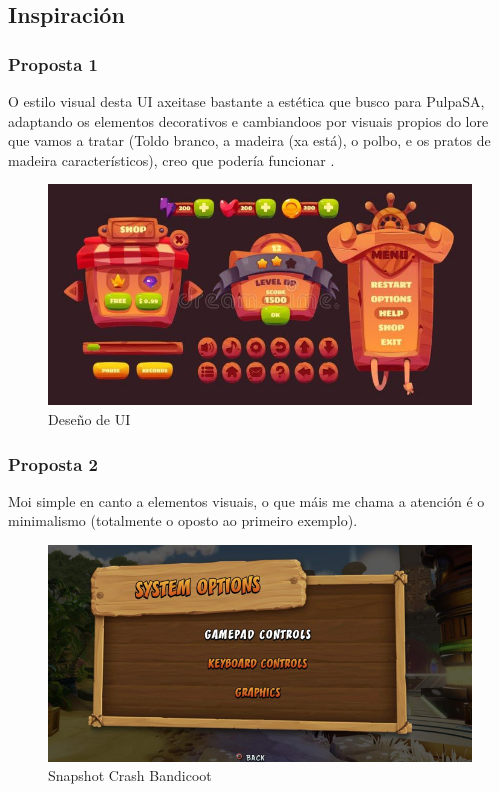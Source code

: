 \documentclass{report}  %
\begin{document}
\clearpage
\subsection{Inspiración}

\subsubsection{Proposta 1}
O estilo visual desta UI axeitase bastante a estética que busco para PulpaSA, 
adaptando os elementos decorativos e cambiandoos por visuais propios do 
lore que vamos a tratar (Toldo branco, a madeira (xa está), o polbo, e os pratos 
de madeira característicos), creo que podería funcionar .
\begin{figure}[h]
    \centering
    \includegraphics[width=1\textwidth]{images/inspiracion1.png}
    \caption{Deseño de UI}
    \label{fig:Overcooked}
\end{figure}
\clearpage
\subsubsection{Proposta 2}
Moi simple en canto a elementos visuais, o que máis me chama a atención é o 
minimalismo (totalmente o oposto ao primeiro exemplo).
\begin{figure}[h]
    \centering
    \includegraphics[width=1\textwidth]{images/inspiracion2.png}
    \caption{Snapshot Crash Bandicoot}
    \label{fig:Proposta ui (Crash Bandicoot)}
\end{figure}
\clearpage
\end{document}
